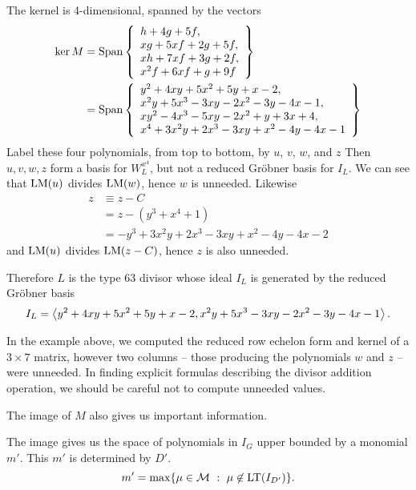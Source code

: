 The kernel is 4-dimensional, spanned by the vectors
\begin{align*}
  \ker M
    &= \operatorname{Span} \left\{ \begin{array}{l}
      h + 4g + 5f, \\
      xg + 5xf + 2g + 5f, \\
      xh + 7xf + 3g + 2f, \\
      x^2f + 6xf + g + 9f \end{array} \right\} \\
    &= \operatorname{Span} \left\{ \begin{array}{l}
      y^2 + 4xy + 5x^2 + 5y + x - 2, \\
      x^2y + 5x^3 - 3xy - 2x^2 - 3y - 4x - 1, \\
      xy^2 - 4x^3 - 5xy - 2x^2 + y + 3x + 4, \\
      x^4 + 3x^2y + 2x^3 - 3xy + x^2 - 4y - 4x - 1
    \end{array} \right\}
\end{align*}
Label these four polynomials, from top to bottom, by $u$, $v$, $w$, and $z$
Then $u,v,w,z$ form a basis for $W_L^{x^4}$, but not a reduced Gr\"obner basis for $I_L$.
We can see that $\operatorname{LM}(u)$ divides $\operatorname{LM}(w)$, hence $w$ is unneeded.
Likewise 
\begin{align*}
  z &\equiv z - C \\
    &= z - (y^3 + x^4 + 1) \\
    &= -y^3 + 3x^2y + 2x^3 - 3xy + x^2 - 4y - 4x - 2
\end{align*}
and $\operatorname{LM}(u)$ divides $\operatorname{LM}(z - C)$, hence $z$ is also unneeded.

Therefore $L$ is the type 63 divisor whose ideal $I_L$ is generated by the reduced Gr\"obner basis
  \[ I_L = \left\langle  y^2 + 4xy + 5x^2 + 5y + x - 2, x^2y + 5x^3 - 3xy - 2x^2 - 3y - 4x - 1 \right\rangle.\]

In the example above, we computed the reduced row echelon form and kernel of a $3 \times 7$ matrix,
however two columns -- those producing the polynomials $w$ and $z$ -- were unneeded.
In finding explicit formulas describing the divisor addition operation, we should be careful not to compute unneeded values.

The image of $M$ also gives us important information.
\begin{center}
\end{center}
The image gives us the space of polynomials in $I_G$ upper bounded by a monomial $m'$.
This $m'$ is determined by $D'$.
  \[ m' = \max \{ \mu \in \mathcal{M} ~:~ \mu \not\in \operatorname{LT}(I_{D'}) \}. \]



